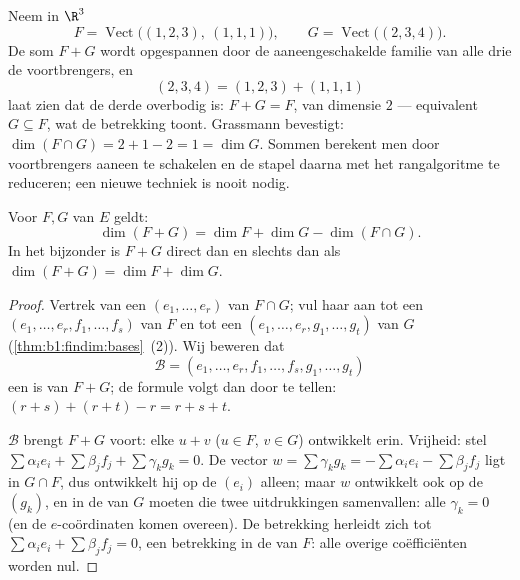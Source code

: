 \begin{example}
\label{ex:b1:findim:sumconcat}
Neem in $\R^3$
\[
F = \operatorname{Vect}\bigl((1,2,3),\ (1,1,1)\bigr),
\qquad
G = \operatorname{Vect}\bigl((2,3,4)\bigr) .
\]
De som $F + G$ wordt opgespannen door de aaneengeschakelde familie
van alle drie de voortbrengers, en
\[
(2, 3, 4) = (1, 2, 3) + (1, 1, 1)
\]
laat zien dat de derde overbodig is: $F + G = F$, van dimensie $2$
--- equivalent $G \subseteq F$, wat de betrekking toont. Grassmann
bevestigt: $\dim(F \cap G) = 2 + 1 - 2 = 1 = \dim G$. Sommen
berekent men door voortbrengers aaneen te schakelen en de stapel
daarna met het rangalgoritme te reduceren; een nieuwe techniek is
nooit nodig.
\end{example}

\begin{theorem}\label{thm:b1:findim:grassmann}
Voor   $F, G$ van $E$
geldt:
\[
\dim(F + G) = \dim F + \dim G - \dim(F \cap G) .
\]
In het bijzonder is $F + G$ direct dan en slechts dan als $\dim(F +
G) = \dim F + \dim G$.
\end{theorem}

\begin{proof}
Vertrek van een  $(e_1, \dots, e_r)$ van $F \cap G$; vul haar
aan tot een  $(e_1, \dots, e_r, f_1, \dots, f_s)$ van $F$ en
tot een  $(e_1, \dots, e_r, g_1, \dots, g_t)$ van $G$
(\cref{thm:b1:findim:bases}~(2)). Wij beweren dat
\[
\mathcal{B} = (e_1, \dots, e_r, f_1, \dots, f_s, g_1, \dots, g_t)
\]
een  is van $F + G$; de formule volgt dan door te tellen: $(r +
s) + (r + t) - r = r + s + t$.

$\mathcal{B}$ brengt $F + G$ voort: elke $u + v$ ($u \in F$, $v \in
G$) ontwikkelt erin. Vrijheid: stel $\sum \alpha_i e_i + \sum
\beta_j f_j + \sum \gamma_k g_k = 0$. De vector $w = \sum \gamma_k
g_k = -\sum\alpha_i e_i - \sum\beta_j f_j$ ligt in $G \cap F$, dus
ontwikkelt hij op de $(e_i)$ alleen; maar $w$ ontwikkelt ook op de
$(g_k)$, en in de  van $G$ moeten die twee uitdrukkingen
samenvallen: alle $\gamma_k = 0$ (en de $e$-coördinaten komen
overeen). De betrekking herleidt zich tot $\sum\alpha_i e_i +
\sum\beta_j f_j = 0$, een betrekking in de  van $F$: alle
overige coëfficiënten worden nul.
\end{proof}

